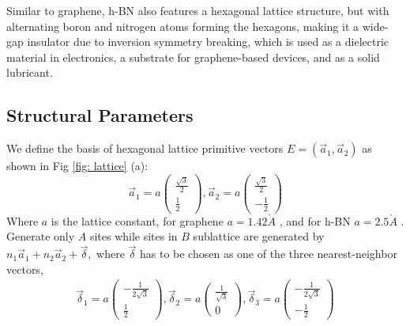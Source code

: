 Similar to graphene, \gls{h-BN} also features a hexagonal lattice structure, but with alternating boron and nitrogen atoms forming the hexagons, making it a wide-gap insulator due to inversion symmetry breaking, which is used as a dielectric material in electronics, a substrate for graphene-based devices, and as a solid lubricant.
\subsection{Structural Parameters}
We define the basis of hexagonal lattice primitive vectors $E = (\vec{a}_{1}, \vec{a}_{2})$ as shown in Fig \ref{fig: lattice} (a):
$$
	\vec{a}_{1}=a\left(\begin{array}{l}
			\frac{\sqrt{3}}{2} \\
			\frac{1}{2}
		\end{array}\right),
	\vec{a}_{2}=a\left(\begin{array}{l}
			\frac{\sqrt{3}}{2} \\
			-\frac{1}{2}
		\end{array}\right)
$$
Where $a$ is the lattice constant, for graphene $a= 1.42 \mathring{A}$ \cite{sarma2011electronic}, and for \gls{h-BN} $a= 2.5 \mathring{A}$ \cite{PhysRevB.81.155433}. Generate only $A$ sites while sites in $B$ sublattice are generated by $n_{1} \vec{a}_{1}+n_{2} \vec{a}_{2}+\vec{\delta},$ where $\vec{\delta}$ has to be chosen as one of the three nearest-neighbor vectors,
$$
	\begin{array}{c}
		\vec{\delta}_{1}=a\left(\begin{array}{l}
				                        -\frac{1}{2 \sqrt{3}} \\ \frac{1}{2}\end{array}\right),
		\vec{\delta}_{2}=a\left(\begin{array}{l}\frac{1}{\sqrt{3}}\\ 0 \end{array}\right),
		\vec{\delta}_{3}=a\left(\begin{array}{l} -\frac{1}{2 \sqrt{3}}\\ -\frac{1}{2}\end{array}\right)
	\end{array}
$$
